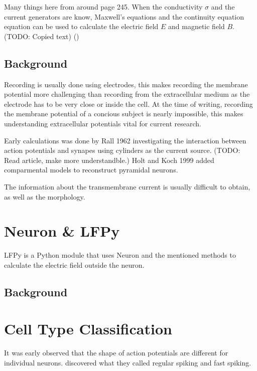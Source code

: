 \documentclass[altfont, fleqn]{uiophd}
\begin{document}
Many things here from around page 245. 
When the conductivity $\sigma$ and the current generators are know, Maxwell's
equations and the continuity equation equation can be used to calculate the electric
field $E$ and magnetic field $B$. (TODO: Copied text)
(\cite{hamalainen_magnetoencephalography-_1993})

\subsection*{Background}
Recording is usually done using electrodes, this makes recording the membrane potential
more challenging than recording from the extracellular medium as the electrode
has to be very close or inside the cell. 
At the time of writing,
recording the membrane potential of a concious subject is nearly impossible,
this makes understanding extracellular potentials vital for current research. 


Early calculations was done by Rall 1962 investigating 
the interaction between action potentials and synapes using cylinders
as the current source. (TODO: Read article, make more understandble.)
Holt and Koch 1999 added comparmental models to reconstruct pyramidal neurons. 

The information about the transmembrane current is usually difficult to obtain,
as well as the morphology.


\section{Neuron \& LFPy }
LFPy is a Python module that uses Neuron and the mentioned methods to calculate the 
electric field outside the neuron. 
\cite{linden_lfpy:_2013}
\subsection*{Background}


\section{Cell Type Classification}
It was early observed that the shape of action potentials are different for 
individual neurons. \textcite{mountcastle_cortical_1969} discovered what
they called regular spiking and fast spiking.
\end{document}
